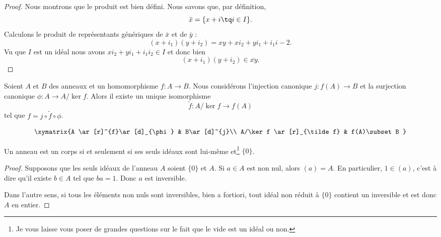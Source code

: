 \begin{proof}
    Nous montrons que le produit est bien défini. Nous savons que, par définition, 
    \begin{equation}
        \bar x=\{ x+i\tq i\in I \}.
    \end{equation}
    Calculons le produit de représentants génériques de \( \bar x\) et de \( \bar y\) :
    \begin{equation}
        (x+i_1)(y+i_2)=xy+xi_2+yi_1+i_1i-2.
    \end{equation}
    Vu que \( I\) est un idéal nous avons \( xi_2+yi_1+i_1i_2\in I\) et donc bien
    \begin{equation}
        (x+i_1)(y+i_2)\in \overline{ xy }.
    \end{equation}
\end{proof}

\begin{proposition}
    Soient \( A\) et \( B\) des anneaux et un homomorphisme \( f\colon A\to B\). Nous considérons l'injection canonique \( j\colon f(A)\to B\) et la surjection canonique \( \phi\colon A\to A/\ker f\). Alors il existe un unique isomorphisme
    \begin{equation}
        \tilde f \colon A/\ker f\to f(A)
    \end{equation}
    tel que \( f=j\circ\tilde f\circ\phi\).

    \begin{equation}
        \xymatrix{%
        A \ar[r]^{f}\ar[d]_{\phi}        &   B\ar[d]^{j}\\
           A/\ker f \ar[r]_{\tilde f}   &   f(A)\subset B
           }
    \end{equation}
\end{proposition}

\begin{proposition}     \label{PROPooUOCVooZGAVVk}
    Un anneau est un corps si et seulement si ses seuls idéaux sont lui-même et\footnote{Je vous laisse vous poser de grandes questions sur le fait que le vide est un idéal ou non.} \( \{ 0 \}\).
\end{proposition}

\begin{proof}
    Supposons que les seuls idéaux de l'anneau \( A\) soient \( \{ 0 \}\) et \( A\). Si \( a\in A\) est non nul, alors \( (a)=A\). En particulier, \( 1\in (a)\), c'est à dire qu'il existe \( b\in A\) tel que \( ba=1\). Donc \( a\) est inversible.

    Dans l'autre sens, si tous les éléments non nuls sont inversibles, bien a fortiori, tout idéal non réduit à \( \{ 0 \}\) contient un inversible et est donc \( A\) en entier.
\end{proof}


